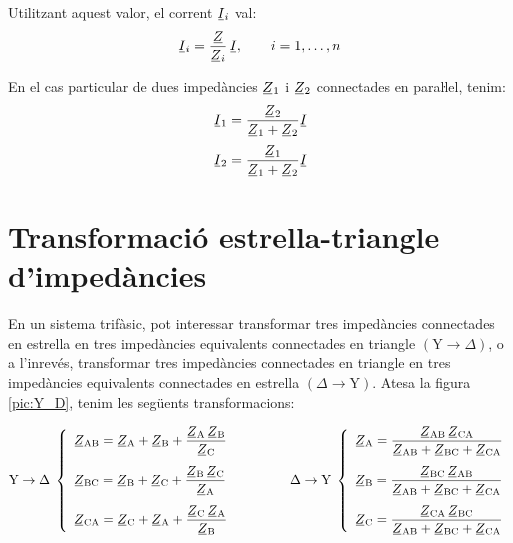 Utilitzant aquest valor, el corrent $\cmplx{I}_i$ val:
\begin{equation}
    \cmplx{I}_i = \frac{\cmplx{Z}}{\cmplx{Z}_i}\,\cmplx{I}, \qquad i=1,\dots,n\label{eq:div_corrent}
\end{equation}

En el cas particular de dues impedàncies $\cmplx{Z}_1$ i $\cmplx{Z}_2$ connectades en paraŀlel, tenim:
\begin{subequations}
\begin{align}
    \cmplx{I}_1 &= \frac{\cmplx{Z}_2}{\cmplx{Z}_1+\cmplx{Z}_2} \cmplx{I}  \\[0.5ex]
    \cmplx{I}_2 &= \frac{\cmplx{Z}_1}{\cmplx{Z}_1+\cmplx{Z}_2} \cmplx{I}
\end{align}
\end{subequations}


\section{Transformació estrella-triangle d'impedàncies}\label{secc:d_y} 

En un sistema trifàsic, pot interessar transformar tres impedàncies connectades en
estrella en tres impedàncies equivalents connectades en triangle
$(\text{Y}\rightarrow\Delta)$, o a l'inrevés, transformar tres impedàncies connectades en
triangle en tres impedàncies equivalents connectades en estrella
$(\Delta\rightarrow\text{Y})$. Atesa la figura \vref{pic:Y_D}, tenim les següents
transformacions:

\begin{equation}\label{eq:Y_D}
   \text{Y}\rightarrow\Delta\;\left\{
   \begin{array}{l}
      \cmplx{Z}\ped{AB} = \displaystyle \cmplx{Z}\ped{A} + \cmplx{Z}\ped{B} + \frac{\cmplx{Z}\ped{A}\,\cmplx{Z}\ped{B}}{\cmplx{Z}\ped{C}}  \\[3ex]
      \cmplx{Z}\ped{BC} = \displaystyle \cmplx{Z}\ped{B} + \cmplx{Z}\ped{C} + \frac{\cmplx{Z}\ped{B}\,\cmplx{Z}\ped{C}}{\cmplx{Z}\ped{A}}  \\[3ex]
      \cmplx{Z}\ped{CA} = \displaystyle \cmplx{Z}\ped{C} + \cmplx{Z}\ped{A} + \frac{\cmplx{Z}\ped{C}\, \cmplx{Z}\ped{A}}{\cmplx{Z}\ped{B}}
   \end{array}
   \right.
   \qquad\qquad
   \Delta\rightarrow\text{Y}\;\left\{
   \begin{array}{l}
      \cmplx{Z}\ped{A} = \dfrac{\cmplx{Z}\ped{AB}\, \cmplx{Z}\ped{CA}}{  \cmplx{Z}\ped{AB} + \cmplx{Z}\ped{BC}+ \cmplx{Z}\ped{CA}}  \\[3ex]
      \cmplx{Z}\ped{B} = \dfrac{\cmplx{Z}\ped{BC}\, \cmplx{Z}\ped{AB}}{  \cmplx{Z}\ped{AB} + \cmplx{Z}\ped{BC}+ \cmplx{Z}\ped{CA}}  \\[3ex]
      \cmplx{Z}\ped{C} = \dfrac{\cmplx{Z}\ped{CA}\, \cmplx{Z}\ped{BC}}{  \cmplx{Z}\ped{AB} + \cmplx{Z}\ped{BC}+ \cmplx{Z}\ped{CA}}
   \end{array}
   \right.
\end{equation}

